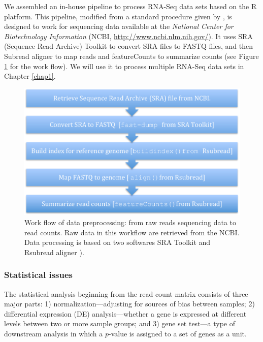 We assembled an in-house pipeline to process RNA-Seq data sets based on the R \citep{Rpackage}
platform.
This pipeline, modified from a standard procedure given by \citet{anders2013count},   is designed to work
for sequencing data available at the \textit{National Center for Biotechnology Information} (NCBI,
\url{http://www.ncbi.nlm.nih.gov/}). It uses SRA (Sequence Read Archive) Toolkit
\citep{leinonen2010sequence} to convert SRA files to FASTQ files,  and then Subread aligner
\citep{liao2013subread} to map reads and featureCounts \citep{liao2013featurecounts} to summarize
counts (see Figure \ref{fig:flowchart} for the work flow). We will use it to process multiple
RNA-Seq data sets in Chapter \ref{chap1}.
\begin{figure}[!ht]
	\centering
	\includegraphics[width=0.7\linewidth]{Figures/flowchart.pdf}
	\caption{Work flow of data preprocessing: from raw reads sequencing data to read counts. Raw data
		in this workflow are retrieved from the NCBI. Data processing is based on two softwares SRA
		Toolkit
		\citep{leinonen2010sequence} 
		and Rsubread aligner \citep{liao2013subread}).}
	\label{fig:flowchart}
\end{figure}	



\subsubsection{Statistical issues}
The statistical analysis beginning from the read count matrix consists of three major parts: 1)
normalization---adjusting for sources of bias between samples; 2) differential expression (DE)
analysis---whether a gene is expressed at different levels between two or more sample groups; and 3)
gene set test---a type of downstream analysis in which a $p$-value is assigned to a set of genes as
a unit.

